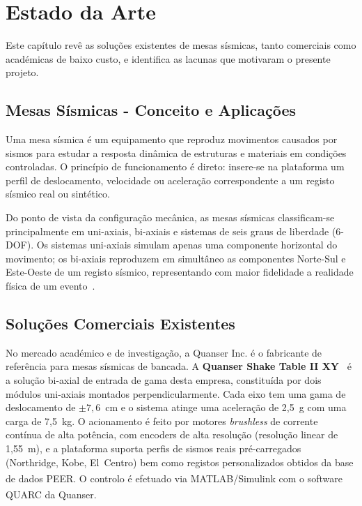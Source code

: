 
\chapter{Estado da Arte}
\label{chapter:stateofart}

\begin{introduction}
Este capítulo revê as soluções existentes de mesas sísmicas, tanto comerciais como académicas de baixo custo, e identifica as lacunas que motivaram o presente projeto.
\end{introduction}

\section{Mesas Sísmicas - Conceito e Aplicações}
\label{sec:conceito}

Uma mesa sísmica é um equipamento que reproduz movimentos causados por sismos para estudar a resposta dinâmica de estruturas e materiais em condições controladas. O princípio de funcionamento é direto: insere-se na plataforma um perfil de deslocamento, velocidade ou aceleração correspondente a um registo sísmico real ou sintético.

Do ponto de vista da configuração mecânica, as mesas sísmicas classificam-se principalmente em uni-axiais, bi-axiais e sistemas de seis graus de liberdade (6-DOF). Os sistemas uni-axiais simulam apenas uma componente horizontal do movimento; os bi-axiais reproduzem em simultâneo as componentes Norte-Sul e Este-Oeste de um registo sísmico, representando com maior fidelidade a realidade física de um evento~\cite{2DOF2025}.

\section{Soluções Comerciais Existentes}
\label{sec:comerciais}

No mercado académico e de investigação, a Quanser Inc. é o fabricante de referência para mesas sísmicas de bancada. A \textbf{Quanser Shake Table II XY}~\cite{QuanserShakeTableIIXY} é a solução bi-axial de entrada de gama desta empresa, constituída por dois módulos uni-axiais montados perpendicularmente. Cada eixo tem uma gama de deslocamento de $\pm7{,}6$~cm e o sistema atinge uma aceleração de 2,5~g com uma carga de 7,5~kg. O acionamento é feito por motores \textit{brushless} de corrente contínua de alta potência, com encoders de alta resolução (resolução linear de 1,55~\textmu m), e a plataforma suporta perfis de sismos reais pré-carregados (Northridge, Kobe, El~Centro) bem como registos personalizados obtidos da base de dados PEER. O controlo é efetuado via MATLAB\textsuperscript{\textregistered}/Simulink\textsuperscript{\textregistered} com o software QUARC\textsuperscript{\textregistered} da Quanser.

